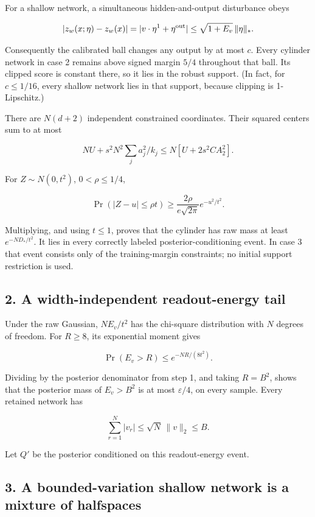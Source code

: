 \documentclass[11pt]{article}
\begin{document}
For a shallow network, a simultaneous hidden-and-output disturbance
obeys

\[
|z_w(x;\eta)-z_w(x)|
=|v\cdot\eta^1+\eta^{\rm out}|
\le\sqrt{1+E_v}\,\|\eta\|_*.
\]

Consequently the calibrated ball changes any output by at most \(c\).
Every cylinder network in case 2 remains above signed margin \(5/4\)
throughout that ball. Its clipped score is constant there, so it lies in
the robust support. (In fact, for \(c\le1/16\), every shallow network
lies in that support, because clipping is 1-Lipschitz.)

There are \(N(d+2)\) independent constrained coordinates. Their squared
centers sum to at most

\[
N U+s^2N^2\sum_j a_j^2/k_j\le N[U+2s^2C A_2^2].
\]

For \(Z\sim N(0,t^2)\), \(0<\rho\le1/4\),

\[
\Pr(|Z-u|\le\rho t)
\ge\frac{2\rho}{e\sqrt{2\pi}}e^{-u^2/t^2}.
\]

Multiplying, and using \(t\le1\), proves that the cylinder has raw mass
at least \(e^{-ND_*/t^2}\). It lies in every correctly labeled
posterior-conditioning event. In case 3 that event consists only of the
training-margin constraints; no initial support restriction is used.

\subsection{2. A width-independent readout-energy
tail}\label{a-width-independent-readout-energy-tail}

Under the raw Gaussian, \(NE_v/t^2\) has the chi-square distribution
with \(N\) degrees of freedom. For \(R\ge8\), its exponential moment
gives

\[
\Pr(E_v>R)\le e^{-NR/(8t^2)}.
\]

Dividing by the posterior denominator from step 1, and taking \(R=B^2\),
shows that the posterior mass of \(E_v>B^2\) is at most
\(\varepsilon/4\), on every sample. Every retained network has

\[
\sum_{r=1}^N|v_r|\le\sqrt N\,\|v\|_2\le B.
\]

Let \(Q'\) be the posterior conditioned on this readout-energy event.

\subsection{3. A bounded-variation shallow network is a mixture of
halfspaces}\label{a-bounded-variation-shallow-network-is-a-mixture-of-halfspaces}
\end{document}

